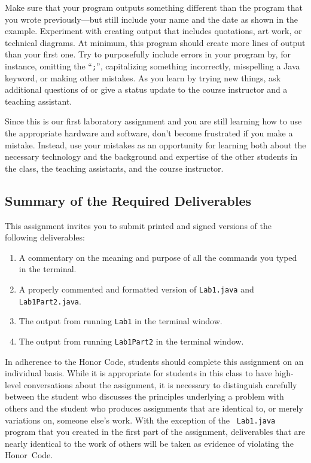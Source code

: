 Make sure that your program outputs something different than the program that you wrote previously---but still include
your name and the date as shown in the example. Experiment with creating output that includes quotations, art work, or
technical diagrams.  At minimum, this program should create more lines of output than your first one. Try to
purposefully include errors in your program by, for instance, omitting the ``{\tt ;}'', capitalizing something
incorrectly, misspelling a Java keyword, or making other mistakes. As you learn by trying new things, ask additional
questions of or give a status update to the course instructor and a teaching assistant.

Since this is our first laboratory assignment and you are still learning how to use the appropriate hardware and
software, don't become frustrated if you make a mistake. Instead, use your mistakes as an opportunity for learning both
about the necessary technology and the background and expertise of the other students in the class, the teaching
assistants, and the course instructor.

\vspace*{-.1in}
\subsection*{Summary of the Required Deliverables}

This assignment invites you to submit printed and signed versions of the following deliverables:

\vspace*{-.1in}
\begin{enumerate}
  \setlength{\itemsep}{0in}
  \item A commentary on the meaning and purpose of all the commands you typed in the terminal.
  \item A properly commented and formatted version of {\tt Lab1.java} and {\tt Lab1Part2.java}.
  \item The output from running {\tt Lab1} in the terminal window.
  \item The output from running {\tt Lab1Part2} in the terminal window.
\end{enumerate}
\vspace*{-.1in}

In adherence to the Honor Code, students should complete this assignment on an individual basis. While it is appropriate
for students in this class to have high-level conversations about the assignment, it is necessary to distinguish
carefully between the student who discusses the principles underlying a problem with others and the student who produces
assignments that are identical to, or merely variations on, someone else's work.  With the exception of the {\tt
  Lab1.java} program that you created in the first part of the assignment, deliverables that are nearly identical to the
work of others will be taken as evidence of violating the \mbox{Honor Code}.



